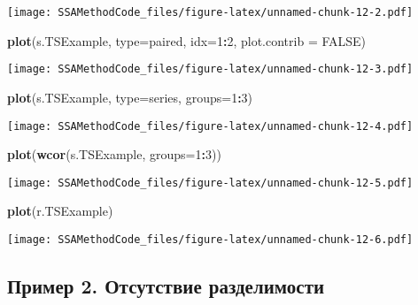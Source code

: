 \documentclass[
]{article}
\newenvironment{Shaded}{\begin{snugshade}}{\end{snugshade}}
\newcommand{\AttributeTok}[1]{\textcolor[rgb]{0.13,0.29,0.53}{#1}}
\newcommand{\ConstantTok}[1]{\textcolor[rgb]{0.56,0.35,0.01}{#1}}
\newcommand{\DecValTok}[1]{\textcolor[rgb]{0.00,0.00,0.81}{#1}}
\newcommand{\FunctionTok}[1]{\textcolor[rgb]{0.13,0.29,0.53}{\textbf{#1}}}
\newcommand{\NormalTok}[1]{#1}
\newcommand{\SpecialCharTok}[1]{\textcolor[rgb]{0.81,0.36,0.00}{\textbf{#1}}}
\newcommand{\StringTok}[1]{\textcolor[rgb]{0.31,0.60,0.02}{#1}}
\begin{document}
\texttt{[image: SSAMethodCode\_files/figure-latex/unnamed-chunk-12-2.pdf]}

\begin{Shaded}
\begin{Highlighting}[]
\FunctionTok{plot}\NormalTok{(s.TSExample, }\AttributeTok{type=}\StringTok{\textquotesingle{}paired\textquotesingle{}}\NormalTok{, }\AttributeTok{idx=}\DecValTok{1}\SpecialCharTok{:}\DecValTok{2}\NormalTok{, }\AttributeTok{plot.contrib =} \ConstantTok{FALSE}\NormalTok{)}
\end{Highlighting}
\end{Shaded}

\texttt{[image: SSAMethodCode\_files/figure-latex/unnamed-chunk-12-3.pdf]}

\begin{Shaded}
\begin{Highlighting}[]
\FunctionTok{plot}\NormalTok{(s.TSExample, }\AttributeTok{type=}\StringTok{\textquotesingle{}series\textquotesingle{}}\NormalTok{, }\AttributeTok{groups=}\DecValTok{1}\SpecialCharTok{:}\DecValTok{3}\NormalTok{)}
\end{Highlighting}
\end{Shaded}

\texttt{[image: SSAMethodCode\_files/figure-latex/unnamed-chunk-12-4.pdf]}

\begin{Shaded}
\begin{Highlighting}[]
\FunctionTok{plot}\NormalTok{(}\FunctionTok{wcor}\NormalTok{(s.TSExample, }\AttributeTok{groups=}\DecValTok{1}\SpecialCharTok{:}\DecValTok{3}\NormalTok{))}
\end{Highlighting}
\end{Shaded}

\texttt{[image: SSAMethodCode\_files/figure-latex/unnamed-chunk-12-5.pdf]}

\begin{Shaded}
\begin{Highlighting}[]
\FunctionTok{plot}\NormalTok{(r.TSExample)}
\end{Highlighting}
\end{Shaded}

\texttt{[image: SSAMethodCode\_files/figure-latex/unnamed-chunk-12-6.pdf]}

\subsection{Пример 2. Отсутствие
разделимости}\label{ux43fux440ux438ux43cux435ux440-2.-ux43eux442ux441ux443ux442ux441ux442ux432ux438ux435-ux440ux430ux437ux434ux435ux43bux438ux43cux43eux441ux442ux438}
\end{document}
